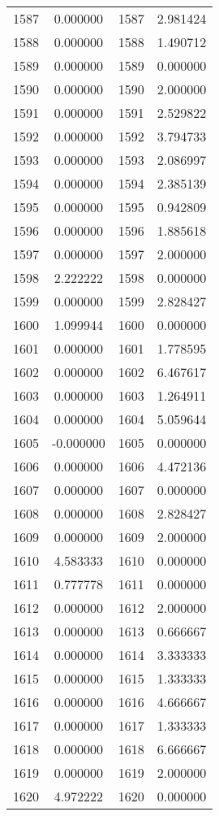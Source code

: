 \documentclass[12pt]{article}
\begin{document}
\begin{longtable}{@{}cccc@{}}
1587 & 0.000000 & 1587 & 2.981424 \\
1588 & 0.000000 & 1588 & 1.490712 \\
1589 & 0.000000 & 1589 & 0.000000 \\
1590 & 0.000000 & 1590 & 2.000000 \\
1591 & 0.000000 & 1591 & 2.529822 \\
1592 & 0.000000 & 1592 & 3.794733 \\
1593 & 0.000000 & 1593 & 2.086997 \\
1594 & 0.000000 & 1594 & 2.385139 \\
1595 & 0.000000 & 1595 & 0.942809 \\
1596 & 0.000000 & 1596 & 1.885618 \\
1597 & 0.000000 & 1597 & 2.000000 \\
1598 & 2.222222 & 1598 & 0.000000 \\
1599 & 0.000000 & 1599 & 2.828427 \\
1600 & 1.099944 & 1600 & 0.000000 \\
1601 & 0.000000 & 1601 & 1.778595 \\
1602 & 0.000000 & 1602 & 6.467617 \\
1603 & 0.000000 & 1603 & 1.264911 \\
1604 & 0.000000 & 1604 & 5.059644 \\
1605 & -0.000000 & 1605 & 0.000000 \\
1606 & 0.000000 & 1606 & 4.472136 \\
1607 & 0.000000 & 1607 & 0.000000 \\
1608 & 0.000000 & 1608 & 2.828427 \\
1609 & 0.000000 & 1609 & 2.000000 \\
1610 & 4.583333 & 1610 & 0.000000 \\
1611 & 0.777778 & 1611 & 0.000000 \\
1612 & 0.000000 & 1612 & 2.000000 \\
1613 & 0.000000 & 1613 & 0.666667 \\
1614 & 0.000000 & 1614 & 3.333333 \\
1615 & 0.000000 & 1615 & 1.333333 \\
1616 & 0.000000 & 1616 & 4.666667 \\
1617 & 0.000000 & 1617 & 1.333333 \\
1618 & 0.000000 & 1618 & 6.666667 \\
1619 & 0.000000 & 1619 & 2.000000 \\
1620 & 4.972222 & 1620 & 0.000000 \\

\end{longtable}
\end{document}
